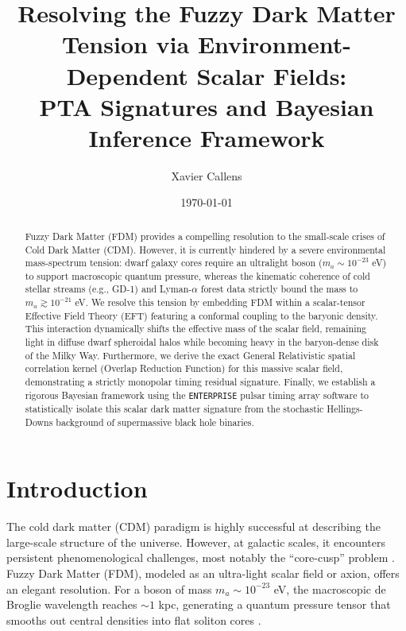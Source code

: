 \documentclass[aps,prd,twocolumn,nofootinbib,superscriptaddress,10pt]{revtex4-2}
\begin{document}
\title{Resolving the Fuzzy Dark Matter Tension via Environment-Dependent Scalar Fields:\\ PTA Signatures and Bayesian Inference Framework}

\author{Xavier Callens}

\date{\today}

\begin{abstract}
Fuzzy Dark Matter (FDM) provides a compelling resolution to the small-scale crises of Cold Dark Matter (CDM). However, it is currently hindered by a severe environmental mass-spectrum tension: dwarf galaxy cores require an ultralight boson ($m_a \sim 10^{-23}$ eV) to support macroscopic quantum pressure, whereas the kinematic coherence of cold stellar streams (e.g., GD-1) and Lyman-$\alpha$ forest data strictly bound the mass to $m_a \gtrsim 10^{-21}$ eV. We resolve this tension by embedding FDM within a scalar-tensor Effective Field Theory (EFT) featuring a conformal coupling to the baryonic density. This interaction dynamically shifts the effective mass of the scalar field, remaining light in diffuse dwarf spheroidal halos while becoming heavy in the baryon-dense disk of the Milky Way. Furthermore, we derive the exact General Relativistic spatial correlation kernel (Overlap Reduction Function) for this massive scalar field, demonstrating a strictly monopolar timing residual signature. Finally, we establish a rigorous Bayesian framework using the \texttt{ENTERPRISE} pulsar timing array software to statistically isolate this scalar dark matter signature from the stochastic Hellings-Downs background of supermassive black hole binaries.
\end{abstract}

\maketitle

\section{Introduction}

The cold dark matter (CDM) paradigm is highly successful at describing the large-scale structure of the universe. However, at galactic scales, it encounters persistent phenomenological challenges, most notably the ``core-cusp'' problem \cite{Weinberg2015}. Fuzzy Dark Matter (FDM), modeled as an ultra-light scalar field or axion, offers an elegant resolution. For a boson of mass $m_a \sim 10^{-23}$ eV, the macroscopic de Broglie wavelength reaches $\sim 1$ kpc, generating a quantum pressure tensor that smooths out central densities into flat soliton cores \cite{Hui2017}.
\end{document}

